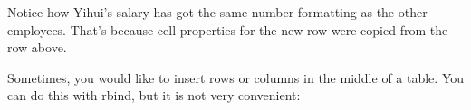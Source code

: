 \documentclass[]{article}
\newenvironment{Shaded}{\begin{snugshade}}{\end{snugshade}}
\newcommand{\DataTypeTok}[1]{\textcolor[rgb]{0.13,0.29,0.53}{#1}}
\newcommand{\DecValTok}[1]{\textcolor[rgb]{0.00,0.00,0.81}{#1}}
\newcommand{\KeywordTok}[1]{\textcolor[rgb]{0.13,0.29,0.53}{\textbf{#1}}}
\newcommand{\NormalTok}[1]{#1}
\newcommand{\OperatorTok}[1]{\textcolor[rgb]{0.81,0.36,0.00}{\textbf{#1}}}
\newcommand{\OtherTok}[1]{\textcolor[rgb]{0.56,0.35,0.01}{#1}}
\newcommand{\StringTok}[1]{\textcolor[rgb]{0.31,0.60,0.02}{#1}}
\begin{document}
\FloatBarrier

Notice how Yihui's salary has got the same number formatting as the
other employees. That's because cell properties for the new row were
copied from the row above.

Sometimes, you would like to insert rows or columns in the middle of a
table. You can do this with rbind, but it is not very convenient:

\begin{Shaded}
\end{Shaded}

 
  \providecommand{\huxb}[2]{\arrayrulecolor[RGB]{#1}\global\arrayrulewidth=#2pt}
  \providecommand{\huxvb}[2]{\color[RGB]{#1}\vrule width #2pt}
  \providecommand{\huxtpad}[1]{\rule{0pt}{\baselineskip+#1}}
  \providecommand{\huxbpad}[1]{\rule[-#1]{0pt}{#1}}
\end{document}
